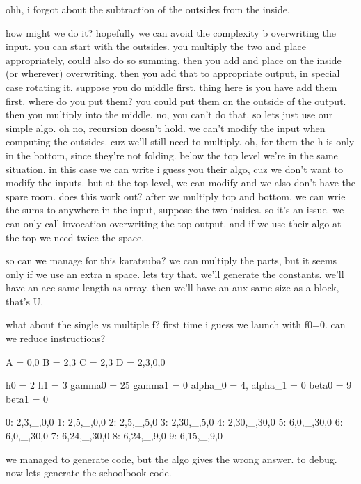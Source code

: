 ohh, i forgot about the subtraction of the outsides from the inside. 

how might we do it?
hopefully we can avoid the complexity b overwriting the input.
you can start with the outsides. you multiply the two and place appropriately, could also do so summing. then you add and place on the inside (or wherever) overwriting. then you add that to appropriate output, in special case rotating it. 
suppose you do middle first. thing here is you have add them first. where do you put them? you could put them on the outside of the output. then you multiply into the middle. no, you can't do that. so lets just use our simple algo.
oh no, recursion doesn't hold. we can't modify the input when computing the outsides. cuz we'll still need to multiply. 
oh, for them the h is only in the bottom, since they're not folding.
below the top level we're in the same situation. in this case we can write i guess you their algo, cuz we don't want to modify the inputs. but at the top level, we can modify and we also don't have the spare room. does this work out?
after we multiply top and bottom, we can wrie the sums to anywhere in the input, suppose the two insides. so it's an issue. we can only call invocation overwriting the top output. and if we use their algo at the top we need twice the space. 

so can we manage for this karatsuba?
we can multiply the parts, but it seems only if we use an extra n space.
lets try that. we'll generate the constants. we'll have an acc same length as array. then we'll have an aux same size as a block, that's U.

what about the single vs multiple f? first time i guess we launch with f0=0. can we reduce instructions?


A = 0,0
B = 2,3
C = 2,3
D = 2,3,0,0

h0 = 2
h1 = 3
gamma0 = 25
gamma1 = 0
alpha_0 = 4,
alpha_1 = 0
beta0 = 9
beta1 = 0

0: 2,3,_,0,0
1: 2,5,_,0,0
2: 2,5,_,5,0
3: 2,30,_,5,0
4: 2,30,_,30,0
5: 6,0,_,30,0
6: 6,0,_,30,0
7: 6,24,_,30,0
8: 6,24,_,9,0
9: 6,15,_,9,0

we managed to generate code, but the algo gives the wrong answer. to debug. 
now lets generate the schoolbook code. 














